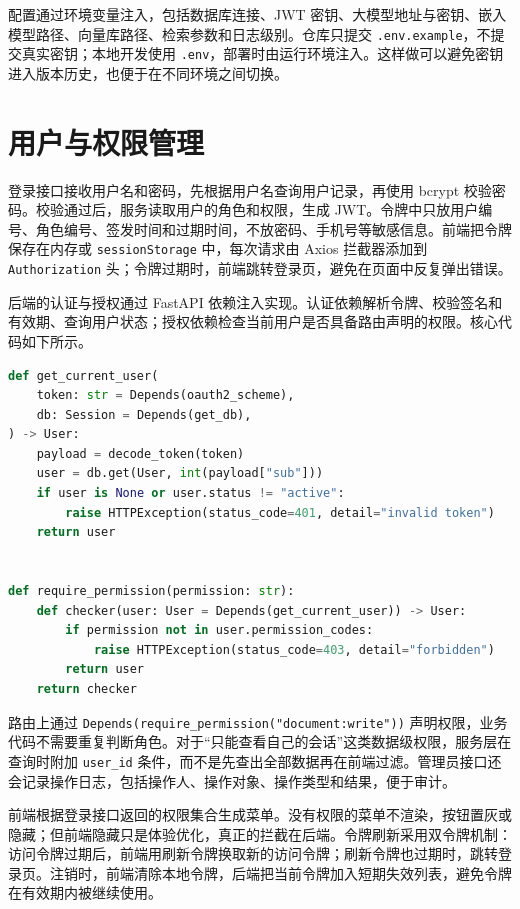 配置通过环境变量注入，包括数据库连接、JWT 密钥、大模型地址与密钥、嵌入模型路径、向量库路径、检索参数和日志级别。仓库只提交 \texttt{.env.example}，不提交真实密钥；本地开发使用 \texttt{.env}，部署时由运行环境注入。这样做可以避免密钥进入版本历史，也便于在不同环境之间切换。

\section{用户与权限管理}
\label{sec:auth-impl}

登录接口接收用户名和密码，先根据用户名查询用户记录，再使用 bcrypt 校验密码。校验通过后，服务读取用户的角色和权限，生成 JWT。令牌中只放用户编号、角色编号、签发时间和过期时间，不放密码、手机号等敏感信息。前端把令牌保存在内存或 \texttt{sessionStorage} 中，每次请求由 Axios 拦截器添加到 \texttt{Authorization} 头；令牌过期时，前端跳转登录页，避免在页面中反复弹出错误。

后端的认证与授权通过 FastAPI 依赖注入实现。认证依赖解析令牌、校验签名和有效期、查询用户状态；授权依赖检查当前用户是否具备路由声明的权限。核心代码如下所示。

\begingroup\linespread{1.0}\selectfont
\begin{lstlisting}[language=Python]
def get_current_user(
    token: str = Depends(oauth2_scheme),
    db: Session = Depends(get_db),
) -> User:
    payload = decode_token(token)
    user = db.get(User, int(payload["sub"]))
    if user is None or user.status != "active":
        raise HTTPException(status_code=401, detail="invalid token")
    return user


def require_permission(permission: str):
    def checker(user: User = Depends(get_current_user)) -> User:
        if permission not in user.permission_codes:
            raise HTTPException(status_code=403, detail="forbidden")
        return user
    return checker
\end{lstlisting}
\endgroup

路由上通过 \texttt{Depends(require\_permission("document:write"))} 声明权限，业务代码不需要重复判断角色。对于“只能查看自己的会话”这类数据级权限，服务层在查询时附加 \texttt{user\_id} 条件，而不是先查出全部数据再在前端过滤。管理员接口还会记录操作日志，包括操作人、操作对象、操作类型和结果，便于审计。

前端根据登录接口返回的权限集合生成菜单。没有权限的菜单不渲染，按钮置灰或隐藏；但前端隐藏只是体验优化，真正的拦截在后端。令牌刷新采用双令牌机制：访问令牌过期后，前端用刷新令牌换取新的访问令牌；刷新令牌也过期时，跳转登录页。注销时，前端清除本地令牌，后端把当前令牌加入短期失效列表，避免令牌在有效期内被继续使用。

